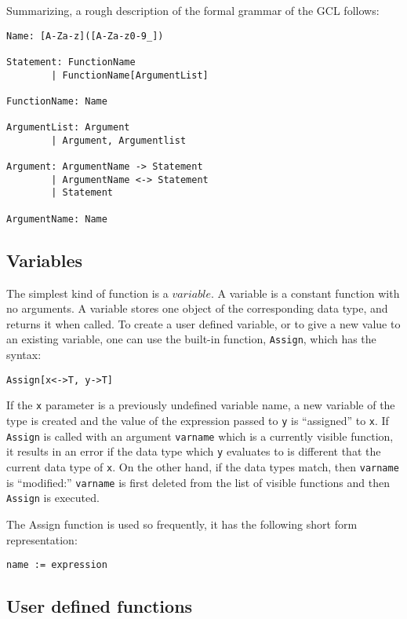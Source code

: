 Summarizing, a rough description of the formal grammar of the GCL
follows:

\begin{verbatim}
Name: [A-Za-z]([A-Za-z0-9_])

Statement: FunctionName
        | FunctionName[ArgumentList]

FunctionName: Name

ArgumentList: Argument
        | Argument, Argumentlist

Argument: ArgumentName -> Statement
        | ArgumentName <-> Statement
        | Statement

ArgumentName: Name
\end{verbatim}

\subsection{Variables}

The simplest kind of function is a $variable$.  A variable is a
constant function with no arguments.  A variable stores one object of
the corresponding data type, and returns it when called.  To create a
user defined variable, or to give a new value to an existing variable,
one can use the built-in function,
\verb+Assign+, which has the syntax:
\begin{verbatim}
Assign[x<->T, y->T]
\end{verbatim}

If the \verb+x+ parameter is a previously undefined variable name, a new
variable of the type is created and the value of the expression passed
to \verb+y+ is ``assigned'' to \verb+x+.  If \verb+Assign+ is called with
an argument \verb+varname+ which is a currently visible function, it results
in an error if the data type which \verb+y+ evaluates to is different that the
current data type of \verb+x+.  On the other hand, if the
data types match, then \verb+varname+ is ``modified:'' \verb+varname+
is first deleted from the list of visible functions and then
\verb+Assign+ is executed.  

The Assign function is used so frequently, it has the following short form
representation:
\begin{verbatim}
name := expression
\end{verbatim}

\subsection{User defined functions}

